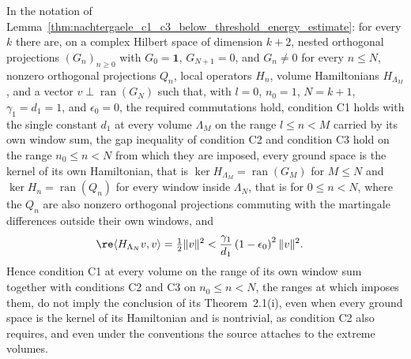 \begin{lemma}
    \label{thm:nachtergaele_threshold_conditions_insufficient}
    \leanok
    In the notation of
    Lemma~\ref{thm:nachtergaele_c1_c3_below_threshold_energy_estimate}: for
    every $k$ there are, on a complex Hilbert space of dimension $k+2$, nested
    orthogonal projections $(G_n)_{n\geq0}$ with $G_0=\mathbf 1$,
    $G_{N+1}=0$, and $G_n\neq0$ for every $n\leq N$, nonzero orthogonal
    projections $Q_n$, local operators $H_n$, volume Hamiltonians
    $H_{\Lambda_M}$, and a vector $v\perp\operatorname{ran}(G_N)$ such that,
    with $l=0$, $n_0=1$, $N=k+1$, $\gamma_1=d_1=1$, and $\epsilon_0=0$, the
    required commutations hold, condition C1 holds with the single constant
    $d_1$ at every volume $\Lambda_M$ on the range $l\leq n<M$ carried by its
    own window sum, the gap inequality of condition C2 and condition C3 hold
    on the range $n_0\leq n<N$ from which they are imposed, every ground space
    is the kernel of its own Hamiltonian, that is
    $\ker H_{\Lambda_M}=\operatorname{ran}(G_M)$ for $M\leq N$ and
    $\ker H_n=\operatorname{ran}(Q_n)$ for every window inside $\Lambda_N$,
    that is for $0\leq n<N$, where the $Q_n$ are also nonzero orthogonal
    projections commuting with the martingale differences outside their own
    windows, and
    \begin{align}
        \re\langle H_{\Lambda_N}v,v\rangle
         & =\tfrac12\lVert v\rVert^2
        <\frac{\gamma_1}{d_1}
        \left(1-\epsilon_0\right)^2\lVert v\rVert^2.
        \label{eq:nachtergaele_threshold_conditions_insufficient}
    \end{align}
    Hence condition C1 at every volume on the range of its own window sum
    together with conditions C2 and C3 on $n_0\leq n<N$, the ranges at which
    \cite{Nachtergaele1996Spectral} imposes them, do not imply the conclusion
    of its Theorem~2.1(i), even when every ground space is the kernel of its
    Hamiltonian and is nontrivial, as condition C2 also requires, and even
    under the conventions the source attaches to the extreme volumes.
\end{lemma}

